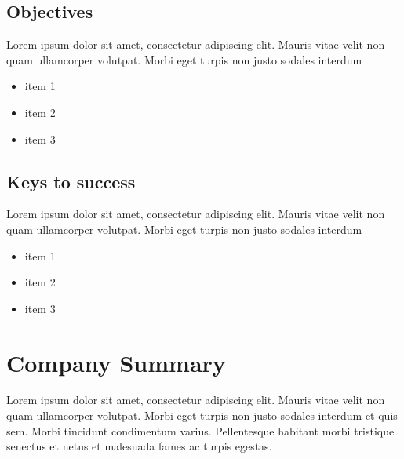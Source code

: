 \documentclass[11pt,a4paper,titlepage]{article}
\begin{document}


\subsection{Objectives}
Lorem ipsum dolor sit amet, consectetur adipiscing elit. Mauris vitae velit 
non quam ullamcorper volutpat. Morbi eget turpis non justo sodales interdum
\newline
\begin{itemize}
\item item 1
\item item 2
\item item 3
\end{itemize}

\subsection{Keys to success}
Lorem ipsum dolor sit amet, consectetur adipiscing elit. Mauris vitae velit 
non quam ullamcorper volutpat. Morbi eget turpis non justo sodales interdum
\newline
\begin{itemize}
\item item 1
\item item 2
\item item 3
\end{itemize}

\section{Company Summary}
Lorem ipsum dolor sit amet, consectetur adipiscing elit. Mauris vitae velit 
non quam ullamcorper volutpat. Morbi eget turpis non justo sodales interdum 
et quis sem. Morbi tincidunt condimentum varius. Pellentesque habitant morbi 
tristique senectus et netus et malesuada fames ac turpis egestas.\newline
\end{document}

